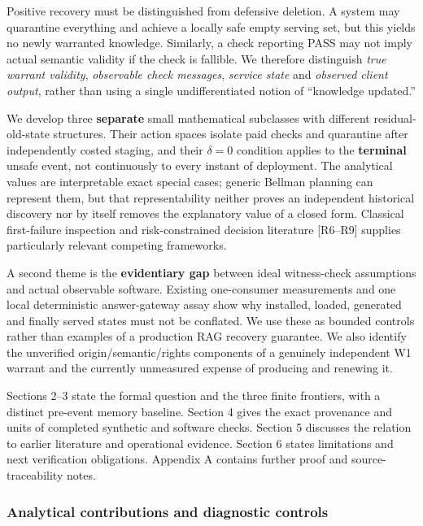 \documentclass[
  10pt,
  american,
  a4paper,
]{article}
\begin{document}
Positive recovery must be distinguished from defensive deletion. A
system may quarantine everything and achieve a locally safe empty
serving set, but this yields no newly warranted knowledge. Similarly, a
check reporting PASS may not imply actual semantic validity if the check
is fallible. We therefore distinguish \emph{true warrant validity},
\emph{observable check messages}, \emph{service state} and
\emph{observed client output}, rather than using a single
undifferentiated notion of ``knowledge updated.''

We develop three \textbf{separate} small mathematical subclasses with
different residual-old-state structures. Their action spaces isolate
paid checks and quarantine after independently costed staging, and their
\(\delta=0\) condition applies to the \textbf{terminal} unsafe event,
not continuously to every instant of deployment. The analytical values
are interpretable exact special cases; generic Bellman planning can
represent them, but that representability neither proves an independent
historical discovery nor by itself removes the explanatory value of a
closed form. Classical first-failure inspection and risk-constrained
decision literature {[}R6--R9{]} supplies particularly relevant
competing frameworks.

A second theme is the \textbf{evidentiary gap} between ideal
witness-check assumptions and actual observable software. Existing
one-consumer measurements and one local deterministic answer-gateway
assay show why installed, loaded, generated and finally served states
must not be conflated. We use these as bounded controls rather than
examples of a production RAG recovery guarantee. We also identify the
unverified origin/semantic/rights components of a genuinely independent
W1 warrant and the currently unmeasured expense of producing and
renewing it.

Sections 2--3 state the formal question and the three finite frontiers,
with a distinct pre-event memory baseline. Section 4 gives the exact
provenance and units of completed synthetic and software checks. Section
5 discusses the relation to earlier literature and operational evidence.
Section 6 states limitations and next verification obligations. Appendix
A contains further proof and source-traceability notes.

\hypertarget{analytical-contributions-and-diagnostic-controls}{%
\subsubsection{Analytical contributions and diagnostic
controls}\label{analytical-contributions-and-diagnostic-controls}}
\end{document}
